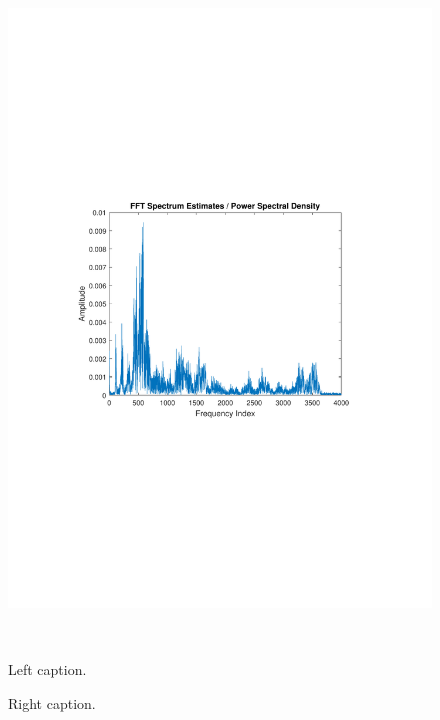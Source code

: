 \begin{figure}[htbp]
\begin{minipage}[b]{0.48\textwidth}
\includegraphics[width=1.00\textwidth]{figures/FFTpicture.pdf} %
\end{minipage} \\ %
\begin{minipage}[t]{0.48\textwidth}
\caption{Left caption.} %
\label{fig:leftlabel}
\end{minipage}%
\hfill
\begin{minipage}[t]{0.48\textwidth}
\caption{Right caption.} %
\label{fig:rightlabel}
\end{minipage}
\end{figure}

